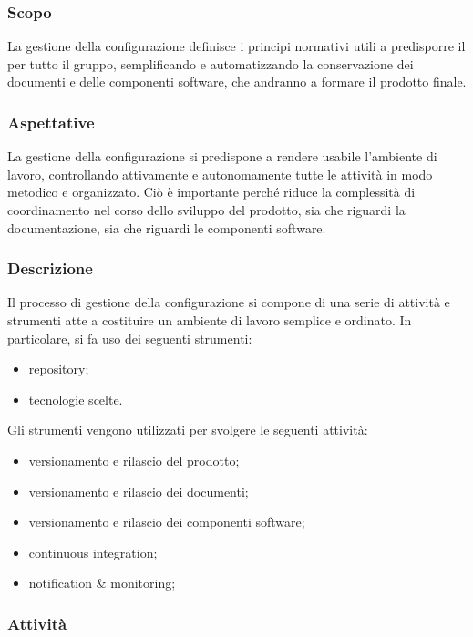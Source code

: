 


\subsubsection{Scopo}

La gestione della configurazione definisce i principi normativi utili a predisporre il  per tutto il gruppo, semplificando e automatizzando la conservazione dei documenti e delle componenti software, che andranno a formare il prodotto finale.

\subsubsection{Aspettative}

La gestione della configurazione si predispone a rendere usabile l'ambiente di lavoro, controllando attivamente e autonomamente tutte le attività in modo metodico e organizzato. Ciò è importante perché riduce la complessità di coordinamento nel corso dello sviluppo del prodotto, sia che riguardi la documentazione, sia che riguardi le componenti software.

\subsubsection{Descrizione}

Il processo di gestione della configurazione si compone di una serie di attività e strumenti atte a costituire un ambiente di lavoro semplice e ordinato. 
In particolare, si fa uso dei seguenti strumenti:
\begin{itemize}
	\item repository;
	\item tecnologie scelte.
\end{itemize}
Gli strumenti vengono utilizzati per svolgere le seguenti attività:
\begin{itemize}
	\item versionamento e rilascio del prodotto;
	\item versionamento e rilascio dei documenti;
	\item versionamento e rilascio dei componenti software;
	\item continuous integration;
	\item notification \& monitoring;
\end{itemize}


\subsubsection{Attività}

